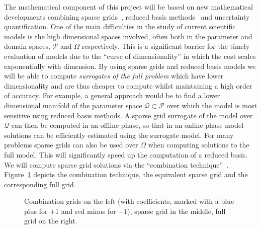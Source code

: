 \documentclass[a4paper,fontsize=12pt]{scrartcl}
\begin{document}
The mathematical component of this project will be based on new
mathematical developments combining sparse grids~\parencite{BungartzGriebel2004}, 
reduced basis methods~\parencite{LiebermanEtal2010,Peherstorfer2013,ChenSchwab2015}
and uncertainty quantification. 
One of the main difficulties in the study of current scientific models is
the high dimensional spaces involved, often both in the parameter and
domain spaces, $\mathcal{P}$ and $\Omega$ respectively. 
This is a significant barrier for the timely evaluation of models due to the 
``curse of dimensionality'' in which the cost scales exponentially with dimension.
By using sparse grids and reduced basis models we will be able to compute
{\em surrogates of the full problem} which have lower dimensionality and are thus cheaper  
to compute whilst maintaining a high order of accuracy.
For example, a general approach would be to find a lower dimensional manifold 
of the parameter space $\mathcal{Q}\subset\mathcal{P}$ over which the 
model is most sensitive using reduced basis methods.
A sparse grid surrogate of the model over $\mathcal{Q}$ can then be 
computed in an offline phase, so that in an online phase model solutions
can be efficiently estimated using the surrogate model.
For many problems sparse grids can also be used over $\Omega$ when  
computing solutions to the full model. 
This will significantly speed up the computation of a reduced basis.
We will compute sparse grid solutions via the
``combination technique''~\parencite{Griebel1990}. 
Figure~\ref{fig:sparse_grids} depicts the combination technique, the
equivalent sparse grid and the corresponding full grid. 

\begin{figure}
  \centering
    
  \caption{Combination grids on the left (with coefficients, marked with
    a blue plus for $+1$ and red minus for $-1$), sparse grid in the
    middle, full grid on the right.}
  \label{fig:sparse_grids}
\end{figure}
\end{document}
